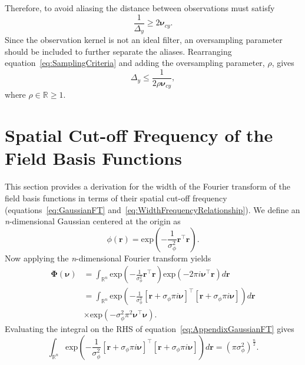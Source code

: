 \documentclass[review,authoryear,3p]{elsarticle}
\begin{document}
{\begin{equation}
\end{equation}
Therefore, to avoid aliasing the distance between observations must satisfy
\begin{equation}\label{eq:SamplingCriteria}
	\frac{1}{\Delta_y} \ge 2\boldsymbol{\nu}_{cy}.
\end{equation}
Since the observation kernel is not an ideal filter, an oversampling parameter should be included to further separate the aliases. Rearranging equation~\ref{eq:SamplingCriteria} and adding the oversampling parameter, $\rho$, gives
\begin{equation}\label{ap:Shannon}
	\Delta_y\le\frac{1}{2\rho\boldsymbol{\nu}_{cy}},
\end{equation}
where $\rho \in \mathbb{R} \ge 1$.}

\section{Spatial Cut-off Frequency of the Field Basis Functions}\label{App:FrequencyAnalysis}
This section provides a derivation for the width of the Fourier transform of the field basis functions in terms of their spatial cut-off frequency (equations~\ref{eq:GaussianFT} and~\ref{eq:WidthFrequencyRelationship}). We define an \textit{n}-dimensional Gaussian centered at the origin as 
\begin{equation}
 \phi(\mathbf r)=\mathrm{exp}\left(-\frac{1}{\sigma_{\phi}^2}\mathbf r^\top\mathbf r\right).
\end{equation}
Now applying the \textit{n}-dimensional Fourier transform yields
\begin{align}\label{eq:AppendixGaussianFT}
 \boldsymbol\Phi(\boldsymbol \nu)&=\int_{\mathbb{R}^n} {\mathrm{exp}\left({-\frac{1}{\sigma_{\phi}^2}\mathbf r^\top\mathbf r}\right)\mathrm{exp}\left(-2\pi i\boldsymbol\nu^\top\mathbf r\right)d\mathbf r} \nonumber \\
&=\int_{\mathbb{R}^n}\mathrm{exp}\left(-\frac{1}{\sigma_{\phi}^2}\left[\mathbf r +\sigma_{\phi}\pi i \boldsymbol\nu\right]^\top\left[\mathbf r +\sigma_{\phi}\pi i \boldsymbol\nu\right]\right)d\mathbf r \nonumber \\ &\times\mathrm{exp}\left(-\sigma_{\phi}^2\pi^2\boldsymbol\nu^\top \boldsymbol\nu\right).
\end{align}
Evaluating the integral on the RHS of equation~\ref{eq:AppendixGaussianFT} gives 
\begin{equation}\label{eq:IntegralOfGaussian}
\int_{\mathbb{R}^n}\mathrm{exp}\left(-\frac{1}{\sigma_{\phi}^2}\left[\mathbf r +\sigma_{\phi}\pi i \boldsymbol\nu\right]^\top\left[\mathbf r +\sigma_{\phi}\pi i \boldsymbol\nu\right]\right)d\mathbf r
=\left(\pi\sigma_{\phi}^2\right)^{\frac{n}{2}}.
\end{equation}
\end{document}
